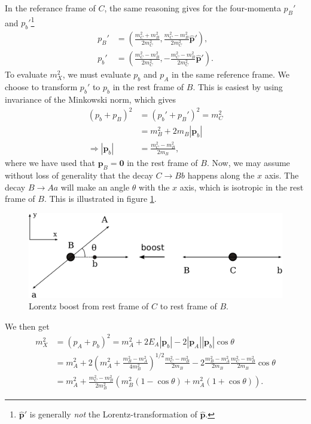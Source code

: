 \documentclass[twoside,english]{uiofysmaster}
\begin{document}
In the referance frame of $C$, the same reasoning gives for the four-momenta $p_B'$ and $p_b'$\footnote{$\hat{\mathbf{p}}'$ is generally {\it not} the Lorentz-transformation of $\hat{\mathbf{p}}$.}
\begin{align}
	p_B' &= \left( \frac{m_C^2+m_B^2}{2m_C^2}, \frac{m_C^2-m_B^2}{2m_C^2} \hat{\mathbf{p}}' \right),\\
	p_b' &= \left( \frac{m_C^2-m_B^2}{2m_C^2}, -\frac{m_C^2-m_B^2}{2m_C^2} \hat{\mathbf{p}}' \right). \nonumber
\end{align}
To evaluate $m_X^2$, we must evaluate $p_b$ and $p_A$ in the same reference frame. We choose to transform $p_b'$ to $p_b$ in the rest frame of $B$. This is easiest by using invariance of the Minkowski norm, which gives
\begin{align}
	(p_b + p_B)^2 &= (p_b' + p_B')^2 = m_C^2\nonumber \\
				  &= m_B^2 + 2m_B|\mathbf{p}_b|\\
	\Rightarrow |\mathbf{p}_b| &= \frac{m_C^2 - m_B^2}{2m_B},\nonumber
\end{align}
where we have used that $\mathbf p_B = \mathbf{0}$ in the rest frame of $B$. Now, we may assume without loss of generality that the decay $C\to Bb$ happens along the $x$ axis. The decay $B\to Aa$ will make an angle $\theta$ with the $x$ axis, which is isotropic in the rest frame of $B$. This is illustrated in figure \ref{fig:lorentz_boost}.
\begin{figure}[hbt]
\centering
\includegraphics[scale=0.7]{figures/appendix/lorentz_boost.pdf}
\caption{Lorentz boost from rest frame of $C$ to rest frame of $B$.}
\label{fig:lorentz_boost}
\end{figure}
We then get
\begin{align}
	m_X^2 &= (p_A + p_b)^2 = m_A^2 + 2E_A|\mathbf{p}_b| - 2|\mathbf{p}_A||\mathbf{p}_b|\cos\theta\\
		&= m_A^2 + 2\left( m_A^2 + \frac{m_B^2 - m_A^2}{4m_B^2} \right)^{1/2}\frac{m_C^2 - m_B^2}{2m_B} -2\frac{m_B^2-m_A^2}{2m_B}\frac{m_C^2 - m_B^2}{2m_B}\cos\theta\nonumber \\
		&= m_A^2 + \frac{m_C^2 - m_B^2}{2m_B^2}\left( m_B^2(1-\cos\theta) + m_A^2(1+\cos\theta) \right).\nonumber
\end{align}
\end{document}
